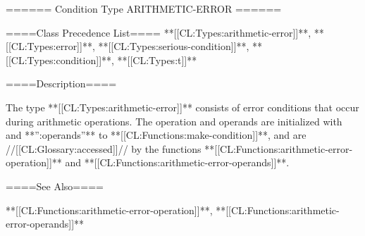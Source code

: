 ====== Condition Type ARITHMETIC-ERROR ======

====Class Precedence List==== **[[CL:Types:arithmetic-error]]**, **[[CL:Types:error]]**, **[[CL:Types:serious-condition]]**, **[[CL:Types:condition]]**, **[[CL:Types:t]]**

====Description====

The type **[[CL:Types:arithmetic-error]]** consists of error conditions that occur during arithmetic operations. The operation and operands are initialized with  and **'':operands''** to **[[CL:Functions:make-condition]]**, and are //[[CL:Glossary:accessed]]// by the functions **[[CL:Functions:arithmetic-error-operation]]** and **[[CL:Functions:arithmetic-error-operands]]**.

====See Also====

**[[CL:Functions:arithmetic-error-operation]]**, **[[CL:Functions:arithmetic-error-operands]]**

